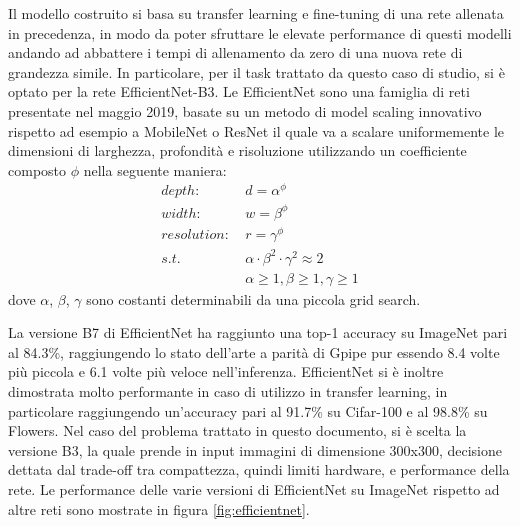         Il modello costruito si basa su transfer learning e fine-tuning di una rete allenata in precedenza, in modo da poter sfruttare le elevate performance di questi modelli andando
        ad abbattere i tempi di allenamento da zero di una nuova rete di grandezza simile. In particolare, per il task trattato da questo caso di studio, si è optato per la rete 
        EfficientNet-B3. Le EfficientNet sono una famiglia di reti presentate nel maggio 2019, basate su un metodo di model scaling innovativo rispetto ad esempio a MobileNet o ResNet
        il quale va a scalare uniformemente le dimensioni di larghezza, profondità e risoluzione utilizzando un coefficiente composto $\phi$ nella seguente maniera:
        \begin{equation}
            \begin{split}
                depth:&\ d = \alpha^\phi\\
                width:&\ w = \beta^\phi\\
                resolution:&\  r = \gamma^\phi\\
                s.t.&\ \alpha \cdot \beta^2 \cdot \gamma^2 \approx 2\\
                &\ \alpha\geq1, \beta\geq1, \gamma\geq1
            \end{split}
        \end{equation}
        dove $\alpha$, $\beta$, $\gamma$ sono costanti determinabili da una piccola grid search.
        
        La versione B7 di EfficientNet ha raggiunto una top-1 accuracy su ImageNet pari al 84.3\%, raggiungendo lo stato dell'arte a parità di Gpipe pur essendo 8.4 volte più piccola e 6.1 volte più veloce nell'inferenza.
        EfficientNet si è inoltre dimostrata molto performante in caso di utilizzo in transfer learning, in particolare raggiungendo un'accuracy pari al 91.7\% su Cifar-100 e al 98.8\% su Flowers. Nel caso del problema trattato in questo documento, si è scelta la versione B3, la quale prende in input immagini di dimensione 300x300, decisione dettata dal trade-off tra compattezza, quindi limiti hardware, e performance della rete. \cite{tan2020efficientnet}
        Le performance delle varie versioni di EfficientNet su ImageNet rispetto ad altre reti sono mostrate in figura \ref{fig:efficientnet}.

